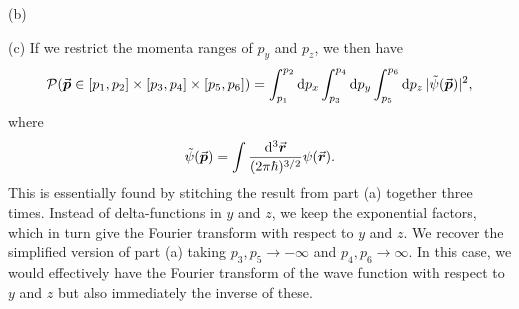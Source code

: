 {%
%
%

(b)

(c) If we restrict the momenta ranges of $p_{y}$ and $p_{z}$, we then have
\begin{eqnarray}
    \mathcal{P}(\va*{p} \in [p_1,p_2] \times [p_3,p_4] \times [p_5,p_6]) = \int_{p_1}^{p_2} \dd{p_{x}} \int_{p_3}^{p_4} \dd{p_{y}} \int_{p_5}^{p_6} \dd{p_{z}} |\tilde{\psi}(\va*{p})|^2
,\end{eqnarray}
where
\begin{eqnarray}
    \tilde{\psi}(\va*{p}) = \int \frac{\dd[3]{\va*{r}}}{(2 \pi \hbar)^{3/2}} \psi(\va*{r})
.\end{eqnarray}
This is essentially found by stitching the result from part (a) together three times.
Instead of delta-functions in $y$ and $z$, we keep the exponential factors, which in turn give the Fourier transform with respect to $y$ and $z$.
We recover the simplified version of part (a) taking $p_3,p_5 \rightarrow -\infty$ and $p_4,p_6 \rightarrow \infty$.
In this case, we would effectively have the Fourier transform of the wave function with respect to $y$ and $z$ but also immediately the inverse of these.


}


